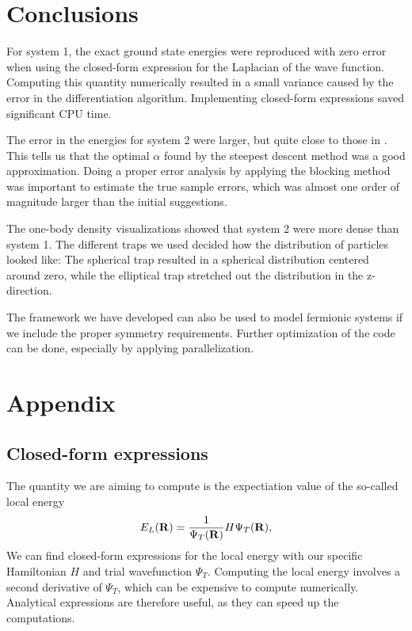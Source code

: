 \documentclass[english, a4paper]{article}
\begin{document}
\section{Conclusions}

For system 1, the exact ground state energies were reproduced with zero error when using the closed-form expression
for the Laplacian of the wave function. Computing this quantity numerically resulted in a small variance caused by 
the error in the differentiation algorithm. Implementing closed-form expressions saved significant CPU time. 

The error in the energies for system 2 were larger, but quite close to those in \cite{ref1}. This tells us 
that the optimal $\alpha$ found by the steepest descent method was a good approximation. 
Doing a proper error analysis by applying the blocking method was important to estimate the true sample errors, which was
almost one order of magnitude larger than the initial suggestions. 

The one-body density visualizations showed that system 2 were more dense than system 1. The different traps we used
decided how the distribution of particles looked like: The spherical trap resulted in a spherical distribution
centered around zero, while the elliptical trap stretched out the distribution in the z-direction. 

The framework we have developed can also be used to model fermionic systems if we include the proper
symmetry requirements. Further optimization of the code can be done, especially by applying parallelization. 




\section{Appendix}

\subsection{Closed-form expressions}

The quantity we are aiming to compute is the expectiation value of the so-called local energy
 \begin{equation}
    E_L({\bf R})=\frac{1}{\Psi_T({\bf R})}H\Psi_T({\bf R}),
    \label{localenergy2}
 \end{equation}
We can find closed-form expressions for the local energy with our specific Hamiltonian $H$ and trial wavefunction $\Psi_T$.
Computing the local energy involves a second derivative of $\Psi_T$, which can be expensive to compute numerically. 
Analytical expressions are therefore useful, as they can speed up the computations.\\
\end{document}
